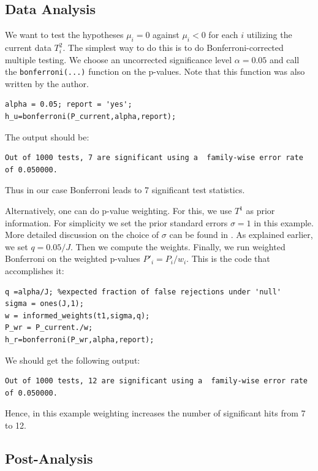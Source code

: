 \documentclass[english,11pt]{article} %
\begin{document}
\subsection{Data Analysis}

We want to test the hypotheses $\mu_i = 0 $ against $\mu_i <0$ for each $i$ utilizing the current data $T^{2}_i$. The simplest way to do this is to do Bonferroni-corrected multiple testing. We choose an uncorrected significance level $\alpha=0.05$ and call the \verb+bonferroni(...)+ function on the p-values. Note that this function was also written by the author.

\begin{verbatim}
alpha = 0.05; report = 'yes';
h_u=bonferroni(P_current,alpha,report);
\end{verbatim}
The output should be:

\begin{verbatim}
Out of 1000 tests, 7 are significant using a  family-wise error rate  of 0.050000.
\end{verbatim}

Thus in our case Bonferroni leads to 7 significant test statistics.

Alternatively, one can do p-value weighting. For this, we use $T^1$ as prior information. For simplicity we set the prior standard errors $\sigma=1$ in this example. More detailed discussion on the choice of $\sigma$ can be found in \citep{dobriban2015optimal}. As explained earlier, we set $q  = 0.05/J$. Then we compute the weights. Finally, we run weighted Bonferroni on the weighted p-values $P'_i = P_i/w_i$. This is the code that accomplishes it:


\begin{verbatim}
q =alpha/J; %expected fraction of false rejections under 'null'
sigma = ones(J,1);
w = informed_weights(t1,sigma,q);
P_wr = P_current./w;
h_r=bonferroni(P_wr,alpha,report);
\end{verbatim}

We should get the following output:

\begin{verbatim}
Out of 1000 tests, 12 are significant using a  family-wise error rate  of 0.050000.
\end{verbatim}

Hence, in this example weighting increases the number of significant hits from 7 to 12.

\subsection{Post-Analysis}
\end{document}
